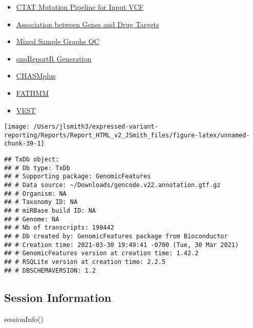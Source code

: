 \documentclass[
]{article}
\newenvironment{Shaded}{\begin{snugshade}}{\end{snugshade}}
\newcommand{\FunctionTok}[1]{\textcolor[rgb]{0.56,0.27,0.68}{#1}}
\newcommand{\NormalTok}[1]{\textcolor[rgb]{0.81,0.81,0.76}{#1}}
\providecommand{\tightlist}{%
  \setlength{\itemsep}{0pt}\setlength{\parskip}{0pt}}
\begin{document}
\begin{itemize}
\tightlist
\item
  \href{https://github.com/collaborativebioinformatics/expressed-variant-impact}{CTAT
  Mutation Pipeline for Input VCF}
\item
  \href{https://github.com/collaborativebioinformatics/viravate2}{Association
  between Genes and Drug Targets}
\item
  \href{https://github.com/collaborativebioinformatics/mixed-sample-graphs}{Mixed
  Sample Graphs QC}
\item
  \href{https://github.com/collaborativebioinformatics/expressed-variant-reporting}{snpReportR
  Generation}
\item
  \href{https://chasmplus.readthedocs.io/en/latest/index.html}{CHASMplus}
\item
  \href{http://fathmm.biocompute.org.uk/}{FATHMM}
\item
  \href{https://karchinlab.org/apps/appVest.html}{VEST}
\end{itemize}

\begin{center}\texttt{[image: /Users/jlsmith3/expressed-variant-reporting/Reports/Report\_HTML\_v2\_JSmith\_files/figure-latex/unnamed-chunk-39-1]} \end{center}

\begin{verbatim}
## TxDb object:
## # Db type: TxDb
## # Supporting package: GenomicFeatures
## # Data source: ~/Downloads/gencode.v22.annotation.gtf.gz
## # Organism: NA
## # Taxonomy ID: NA
## # miRBase build ID: NA
## # Genome: NA
## # Nb of transcripts: 198442
## # Db created by: GenomicFeatures package from Bioconductor
## # Creation time: 2021-03-30 19:49:41 -0700 (Tue, 30 Mar 2021)
## # GenomicFeatures version at creation time: 1.42.2
## # RSQLite version at creation time: 2.2.5
## # DBSCHEMAVERSION: 1.2
\end{verbatim}

\hypertarget{session-information}{%
\subsection{Session Information}\label{session-information}}

\begin{Shaded}
\begin{Highlighting}[]
\FunctionTok{sessionInfo}\NormalTok{()}
\end{Highlighting}
\end{Shaded}
\end{document}
